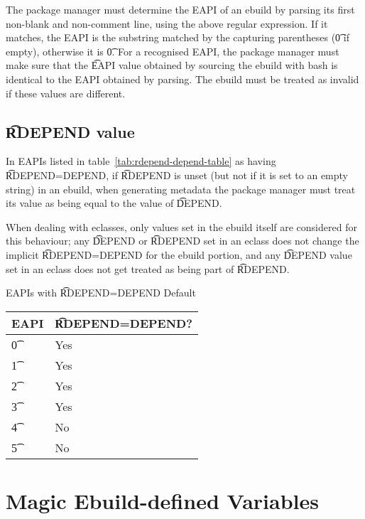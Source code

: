 The package manager must determine the EAPI of an ebuild by parsing its first non-blank and
non-comment line, using the above regular expression. If it matches, the EAPI is the substring
matched by the capturing parentheses (\t{0} if empty), otherwise it is \t{0}. For a recognised
EAPI, the package manager must make sure that the \t{EAPI} value obtained by sourcing the ebuild
with bash is identical to the EAPI obtained by parsing. The ebuild must be treated as invalid if
these values are different.

\subsection{\t{RDEPEND} value}
\label{sec:rdepend-depend}

 In EAPIs listed in table~\ref{tab:rdepend-depend-table} as having
\t{RDEPEND=DEPEND}, if \t{RDEPEND} is unset (but not if it is set to an empty string) in an ebuild,
when generating metadata the package manager must treat its value as being equal to the value of
\t{DEPEND}.

When dealing with eclasses, only values set in the ebuild itself are considered for this behaviour;
any \t{DEPEND} or \t{RDEPEND} set in an eclass does not change the implicit \t{RDEPEND=DEPEND} for
the ebuild portion, and any \t{DEPEND} value set in an eclass does not get treated as being part of
\t{RDEPEND}.

\begin{centertable}{EAPIs with \t{RDEPEND=DEPEND} Default} \label{tab:rdepend-depend-table}
    \begin{tabular}{ l l }
        \toprule
        \multicolumn{1}{c}{\textbf{EAPI}} &
        \multicolumn{1}{c}{\textbf{\t{RDEPEND=DEPEND}?}} \\
        \midrule
    \t{0} & Yes \\
    \t{1} & Yes \\
    \t{2} & Yes \\
    \t{3} & Yes \\
    \t{4} & No \\
    \t{5} & No \\
    \bottomrule
    \end{tabular}
\end{centertable}

\section{Magic Ebuild-defined Variables}

